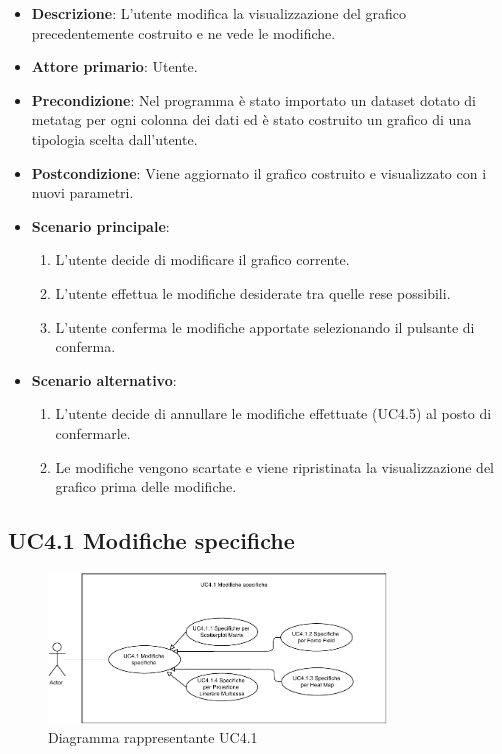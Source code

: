 \begin{itemize}
    \item \textbf{Descrizione}: L’utente modifica la visualizzazione del grafico precedentemente costruito
                                e ne vede le modifiche.
	
    \item \textbf{Attore primario}: Utente.
    
    \item \textbf{Precondizione}:   Nel programma è stato importato un dataset dotato di metatag per ogni
                                    colonna dei dati ed è stato costruito un grafico di una tipologia scelta dall'utente.

    \item \textbf{Postcondizione}:  Viene aggiornato il grafico costruito e visualizzato con i nuovi parametri.

	\item \textbf{Scenario principale}:
		\begin{enumerate}
			\item L'utente decide di modificare il grafico corrente.
			\item L'utente effettua le modifiche desiderate tra quelle rese possibili.
            \item L'utente conferma le modifiche apportate selezionando il pulsante di conferma.
        \end{enumerate}

    \item \textbf{Scenario alternativo}: %
        \begin{enumerate}
            \item L'utente decide di annullare le modifiche effettuate (UC4.5) al posto di confermarle.   
            \item Le modifiche vengono scartate e viene ripristinata la visualizzazione del grafico prima delle modifiche.
        \end{enumerate}
    
\end{itemize}

\newpage
\subsection{UC4.1 Modifiche specifiche}
\label{subsec:uc4.1}

\begin{figure}[h]
    \centering
    \includegraphics[width=0.8\textwidth]{componenti/casi-duso/diagrammi/UC4.1.pdf}
    \caption{Diagramma rappresentante UC4.1}
    \label{fig:UC4}
\end{figure}

